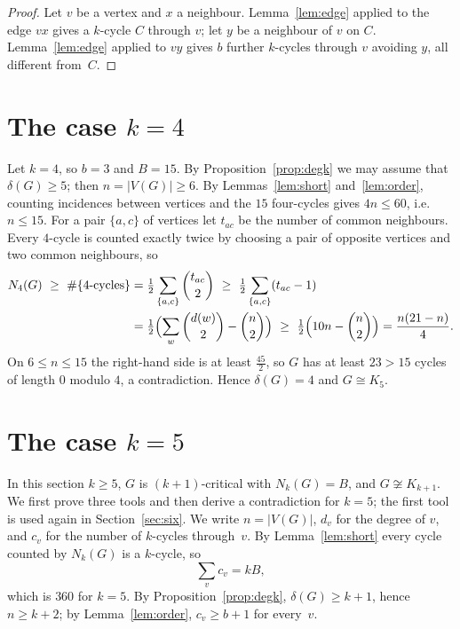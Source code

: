 \documentclass[11pt]{article}
\theoremstyle{remark}
\begin{document}
\begin{proof}
Let $v$ be a vertex and $x$ a neighbour. Lemma~\ref{lem:edge} applied to the
edge $vx$ gives a $k$-cycle $C$ through $v$; let $y$ be a neighbour of $v$ on
$C$.
Lemma~\ref{lem:edge} applied to $vy$ gives $b$ further $k$-cycles through $v$
avoiding $y$, all different from~$C$.
\end{proof}

\section{The case $k=4$}\label{sec:four}

Let $k=4$, so $b=3$ and $B=15$. By Proposition~\ref{prop:degk} we may assume
that $\delta(G)\ge5$; then $n=|V(G)|\ge6$. By Lemmas~\ref{lem:short}
and~\ref{lem:order}, counting incidences between vertices and the $15$
four-cycles gives $4n\le60$, i.e.\ $n\le15$. For a pair $\{a,c\}$ of vertices let $t_{ac}$ be the
number of common neighbours. Every $4$-cycle is counted exactly twice by
choosing a pair of opposite vertices and two common neighbours, so
\begin{align*}
N_4(G)\ \ge\ \#\{4\text{-cycles}\}&=\tfrac12\sum_{\{a,c\}}\binom{t_{ac}}{2}
\ \ge\ \tfrac12\sum_{\{a,c\}}(t_{ac}-1)\\
&=\tfrac12\Bigl(\sum_w\binom{d(w)}{2}-\binom n2\Bigr)
\ \ge\ \tfrac12\Bigl(10n-\binom n2\Bigr)=\frac{n(21-n)}4 .
\end{align*}
On $6\le n\le15$ the right-hand side is at least $\frac{45}{2}$, so $G$ has at
least $23>15$ cycles of length $0$ modulo $4$, a contradiction. Hence
$\delta(G)=4$ and $G\cong K_5$.

\section{The case $k=5$}\label{sec:five}

In this section $k\ge5$, $G$ is $(k+1)$-critical with $N_k(G)=B$, and
$G\not\cong K_{k+1}$. We first prove three tools and then derive a
contradiction for $k=5$; the first tool is used again in
Section~\ref{sec:six}. We write
$n=|V(G)|$, $d_v$ for the degree of $v$, and $c_v$ for the number of
$k$-cycles through~$v$. By Lemma~\ref{lem:short} every cycle counted by
$N_k(G)$ is a $k$-cycle, so
\begin{equation}\label{eq:incidence}
\sum_{v} c_v = kB,
\end{equation}
which is $360$ for $k=5$. By
Proposition~\ref{prop:degk}, $\delta(G)\ge k+1$, hence $n\ge k+2$; by
Lemma~\ref{lem:order}, $c_v\ge b+1$ for every~$v$.
\end{document}

